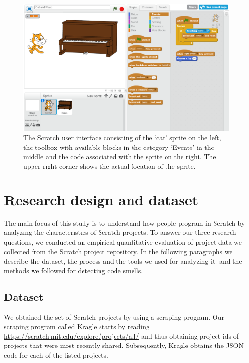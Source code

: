 \documentclass{sig-alternate}
\begin{document}
\begin{figure}
	\begin{center}
		\includegraphics[width=\columnwidth]{fig/ui.png}
		\caption{The Scratch user interface consisting of the `cat' sprite on the left, the toolbox with available blocks in the category `Events' in the middle and the code associated with the sprite on the right. The upper right corner shows the actual location of the sprite.}
		\label{fig:ui}
	\end{center}
\end{figure} 

\section{Research design and dataset}
\label{researchDesign}

The main focus of this study is to understand how people program in Scratch by analyzing the characteristics of Scratch projects. To answer our three research questions, we conducted an empirical quantitative evaluation of project data we collected from the Scratch project repository. In the following paragraphs we describe the dataset, the  process and the tools we used for analyzing it, and the methods we followed for detecting code smells.

\subsection{Dataset}
\label{dataset}

We obtained the set of Scratch projects by using a scraping program. Our scraping program called Kragle starts by reading \url{https://scratch.mit.edu/explore/projects/all/} and thus obtaining project ids of projects that were most recently shared. Subsequently, Kragle obtains the JSON code for each of the listed projects. 
\end{document}

